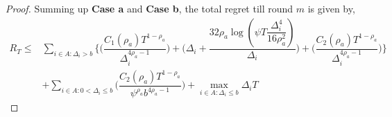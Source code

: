 \begin{proof}

 
Summing up \textbf{Case a} and \textbf{Case b}, the total regret till round $m$ is given by,
\begin{align*}
 R_{T} \leq &\sum\limits_{i\in A:\Delta_{i} > b}\bigg\lbrace\bigg(\dfrac{C_{1}(\rho_{a})T^{1-\rho_{a}}}{\Delta_{i}^{4\rho_{a}-1}}\bigg) + \bigg(\Delta_{i}+\dfrac{32\rho_{a}\log{(\psi  T\dfrac{\Delta_{i}^{4}}{16\rho_{a}^{2}})}}{\Delta_{i}}\bigg)
  +  \bigg(\dfrac{C_{2}(\rho_{a})T^{1-\rho_{a}}}{\Delta_{i}^{4\rho_{a} -1}} \bigg) \bigg \rbrace\\
  & +\sum\limits_{i\in A:0 < \Delta_{i}\leq b}\bigg(\dfrac{C_{2}(\rho_{a})T^{1-\rho_{a}}}{\psi^{\rho_{a}}b^{4\rho_{a} -1}} \bigg) + \max_{i\in A:\Delta_{i}\leq b}\Delta_{i}T
\end{align*}

  
\end{proof}

